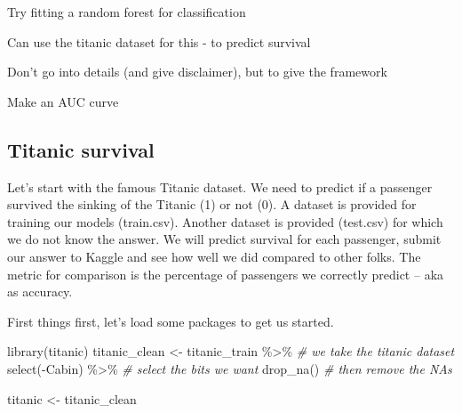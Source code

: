 \documentclass[
]{book}
\newenvironment{Shaded}{\begin{snugshade}}{\end{snugshade}}
\newcommand{\CommentTok}[1]{\textcolor[rgb]{0.56,0.35,0.01}{\textit{#1}}}
\newcommand{\FunctionTok}[1]{\textcolor[rgb]{0.00,0.00,0.00}{#1}}
\newcommand{\NormalTok}[1]{#1}
\newcommand{\OtherTok}[1]{\textcolor[rgb]{0.56,0.35,0.01}{#1}}
\newcommand{\SpecialCharTok}[1]{\textcolor[rgb]{0.00,0.00,0.00}{#1}}
\begin{document}
Try fitting a random forest for classification

Can use the titanic dataset for this - to predict survival

Don't go into details (and give disclaimer), but to give the framework

Make an AUC curve

\hypertarget{titanic-survival}{%
\subsection{Titanic survival}\label{titanic-survival}}

Let's start with the famous Titanic dataset. We need to predict if a passenger survived the sinking of the Titanic (1) or not (0). A dataset is provided for training our models (train.csv). Another dataset is provided (test.csv) for which we do not know the answer. We will predict survival for each passenger, submit our answer to Kaggle and see how well we did compared to other folks. The metric for comparison is the percentage of passengers we correctly predict -- aka as accuracy.

First things first, let's load some packages to get us started.

\begin{Shaded}
\begin{Highlighting}[]
\FunctionTok{library}\NormalTok{(titanic)}
\NormalTok{titanic\_clean }\OtherTok{\textless{}{-}}\NormalTok{ titanic\_train }\SpecialCharTok{\%\textgreater{}\%} \CommentTok{\# we take the titanic dataset}
    \FunctionTok{select}\NormalTok{(}\SpecialCharTok{{-}}\NormalTok{Cabin) }\SpecialCharTok{\%\textgreater{}\%} \CommentTok{\# select the bits we want}
    \FunctionTok{drop\_na}\NormalTok{() }\CommentTok{\# then remove the NAs}
\end{Highlighting}
\end{Shaded}

\begin{Shaded}
\begin{Highlighting}[]
\NormalTok{titanic }\OtherTok{\textless{}{-}}\NormalTok{ titanic\_clean}
\end{Highlighting}
\end{Shaded}
\end{document}
